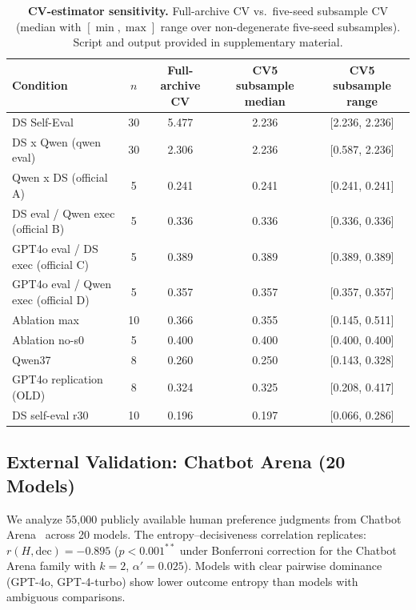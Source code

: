 \documentclass[11pt]{article}
\begin{document}
\begin{table}[t]
\centering
\caption{\textbf{CV-estimator sensitivity.} Full-archive CV vs.\ five-seed subsample CV (median with $[\min,\max]$ range over non-degenerate five-seed subsamples). Script and output provided in supplementary material.}
\label{tab:cv-sens}
\small
\begin{tabular}{@{}lcccc@{}}
\toprule
Condition & $n$ & Full-archive CV & CV5 subsample median & CV5 subsample range \\
\midrule
DS Self-Eval & 30 & 5.477 & 2.236 & [2.236, 2.236] \\
DS x Qwen (qwen eval) & 30 & 2.306 & 2.236 & [0.587, 2.236] \\
Qwen x DS (official A) & 5 & 0.241 & 0.241 & [0.241, 0.241] \\
DS eval / Qwen exec (official B) & 5 & 0.336 & 0.336 & [0.336, 0.336] \\
GPT4o eval / DS exec (official C) & 5 & 0.389 & 0.389 & [0.389, 0.389] \\
GPT4o eval / Qwen exec (official D) & 5 & 0.357 & 0.357 & [0.357, 0.357] \\
Ablation max & 10 & 0.366 & 0.355 & [0.145, 0.511] \\
Ablation no-s0 & 5 & 0.400 & 0.400 & [0.400, 0.400] \\
Qwen37 & 8 & 0.260 & 0.250 & [0.143, 0.328] \\
GPT4o replication (OLD) & 8 & 0.324 & 0.325 & [0.208, 0.417] \\
DS self-eval r30 & 10 & 0.196 & 0.197 & [0.066, 0.286] \\
\bottomrule
\end{tabular}
\end{table}



\subsection{External Validation: Chatbot Arena (20 Models)}

We analyze 55,000 publicly available human preference judgments from Chatbot Arena~\cite{chiang2024chatbot} across 20 models. The entropy--decisiveness correlation replicates: $r(H, \text{dec}) = -0.895$ ($p < 0.001^{**}$ under Bonferroni correction for the Chatbot Arena family with $k = 2$, $\alpha' = 0.025$). Models with clear pairwise dominance (GPT-4o, GPT-4-turbo) show lower outcome entropy than models with ambiguous comparisons.
\end{document}
